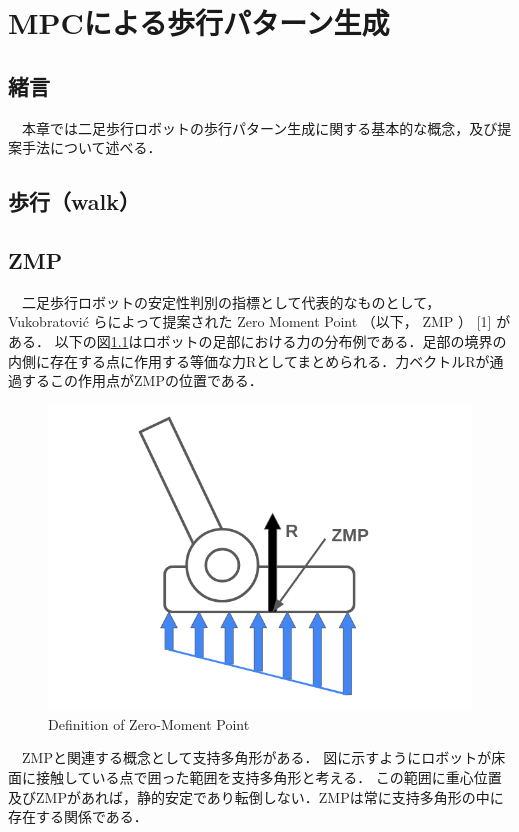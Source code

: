 \chapter{MPCによる歩行パターン生成}
\section{緒言}
　本章では二足歩行ロボットの歩行パターン生成に関する基本的な概念，及び提案手法について述べる．

\section{歩行（walk）}


\section{ZMP}
　二足歩行ロボットの安定性判別の指標として代表的なものとして， Vukobratović らによって提案された Zero Moment Point （以下， ZMP ） [1] がある． 以下の図\ref{Fig:Definition of Zero-Moment Point}はロボットの足部における力の分布例である．足部の境界の内側に存在する点に作用する等価な力Rとしてまとめられる．力ベクトルRが通過するこの作用点がZMPの位置である．


\begin{figure}[H]
  \centering
 \includegraphics[keepaspectratio, scale=0.4]
      {images/walk/zmp.png}
 \caption{Definition of Zero-Moment Point}
 \label{Fig:Definition of Zero-Moment Point}
\end{figure}

　ZMPと関連する概念として支持多角形がある．
図に示すようにロボットが床面に接触している点で囲った範囲を支持多角形と考える．
この範囲に重心位置及びZMPがあれば，静的安定であり転倒しない．ZMPは常に支持多角形の中に存在する関係である．


